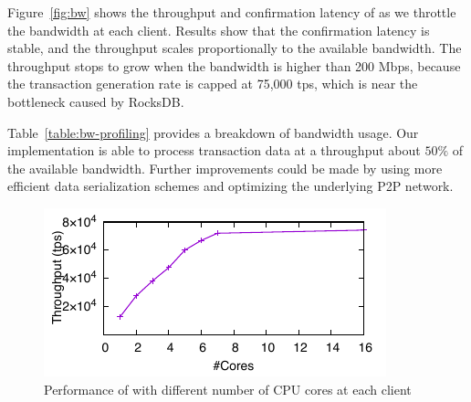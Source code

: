 \begin{table}[ht]
\centering
\caption{\small Network bandwidth usage breakdown of \prism measured on a 200 Mbps interface. Network Headroom is the unused bandwidth necessary for the block propagation delay to stay stable. Serialization overhead is wasted space when serializing in-memory objects for network transmission. Messaging stands for non-block messages.}

\label{table:bw-profiling}
\end{table}

 Figure~\ref{fig:bw} shows the throughput and confirmation latency of \prism as we throttle the bandwidth at each client. Results show that the confirmation latency is stable, and the throughput scales proportionally to the available bandwidth. The throughput stops to grow when the bandwidth is higher than 200 Mbps, because the transaction generation rate is capped at 75,000 tps, which is near the bottleneck caused by RocksDB.

Table~\ref{table:bw-profiling} provides a breakdown of bandwidth usage. Our implementation is able to process transaction data at a throughput about $50\%$ of the available bandwidth. Further improvements could be made by using more efficient data serialization schemes and optimizing the underlying P2P network.

\begin{figure}
    \centering
    \includegraphics{figures/resource-fig-cpu.pdf}
\caption{\small Performance of \prism with different number of CPU cores at each client}
    \label{fig:cpu}
\end{figure}

